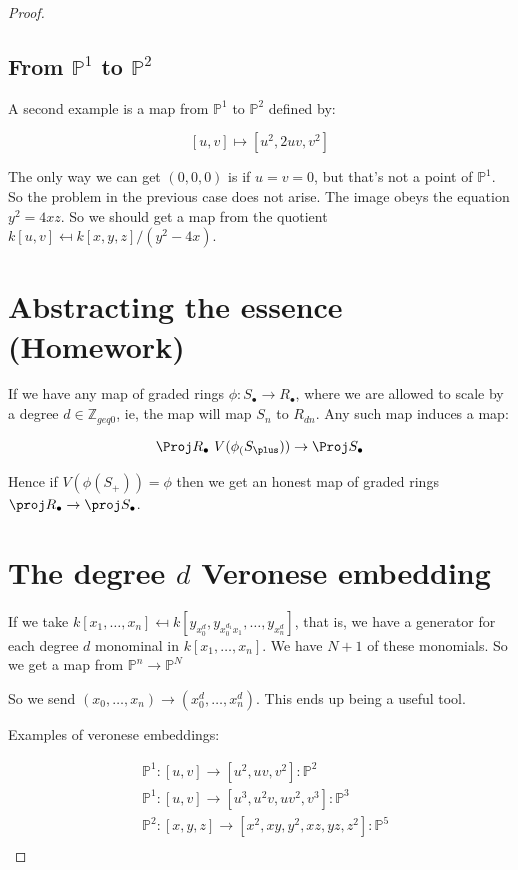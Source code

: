 \documentclass{book}
\newcommand{\Z}{\ensuremath{\mathbb{Z}}}
\renewcommand{\P}{\ensuremath{\mathbb{P}}}
\newcommand{\grade}{\ensuremath{\bullet}}
\theoremstyle{definition}
\begin{document}
\begin{proof}
\subsection{From $\P^1$ to $\P^2$}
A second example is a map from  $\P^1$ to $\P^2$ defined by:

$$
[u, v] \mapsto [u^2, 2uv, v^2]
$$

The only way we can get $(0, 0, 0)$ is if $u = v = 0$, but that's not a point
of $\P^1$. So the problem in the previous case does not arise. The image
obeys the equation $y^2 = 4xz$. So we should get a map from the quotient
$k[u, v] \mapsfrom k[x, y, z]/(y^2 - 4x)$.


\section{Abstracting the essence (Homework)}
If we have any map of graded rings $\phi: S_\bullet \rightarrow R_\bullet$,
where we are allowed to scale by a degree $d \in \Z_{geq 0}$, ie, the map
will map $S_n$ to $R_{dn}$. Any such map induces a map:

$$
\Proj R_\grade \ V(\phi_(S_\plus)) \rightarrow \Proj S_\grade
$$

Hence if $V(\phi(S_+)) = \phi$ then we get an honest map of graded rings
$\proj R_\grade \rightarrow \proj S_\grade$. 


\section{The degree $d$ Veronese embedding}

If we take $k[x_1, \dots, x_{n}] \mapsfrom k[y_{x_0^d}, y_{x_0^{d_1} x_1}, \dots, y_{x_n^d}]$,
that is, we have a generator for each degree $d$ monominal in $k[x_1, \dots, x_n]$.
We have $N + 1$ of these monomials. So we get a map from $\P^n \rightarrow \P^N$

So we send $(x_0, \dots, x_n) \rightarrow (x_0^d, \dots, x_n^d)$. This ends up
being a useful tool.

Examples of veronese embeddings:

\begin{align*}
&\P^1: [u, v] \rightarrow [u^2, uv, v^2]: \P^2 \\
&\P^1: [u, v] \rightarrow [u^3, u^2v, uv^2, v^3]: \P^3 \\
&\P^2: [x, y, z] \rightarrow [x^2, xy, y^2, xz, yz, z^2]: \P^5\\
\end{align*}


\end{proof}
\end{document}
